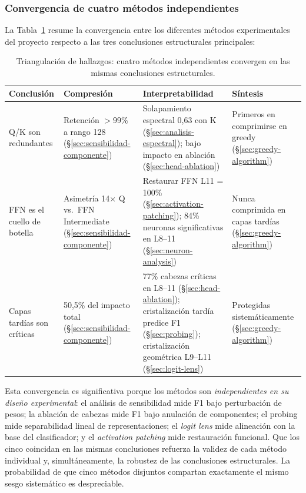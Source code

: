 \subsubsection{Convergencia de cuatro métodos independientes}

La Tabla~\ref{tab:triangulation} resume la convergencia entre los
diferentes métodos experimentales del proyecto respecto a las tres
conclusiones estructurales principales:

\begin{table}[ht]
\centering
\caption{Triangulación de hallazgos: cuatro métodos independientes
convergen en las mismas conclusiones estructurales.}
\label{tab:triangulation}
\small
\begin{tabular}{p{3.0cm}p{3.3cm}p{3.5cm}p{3.5cm}}
\toprule
\textbf{Conclusión} & \textbf{Compresión} & \textbf{Interpretabilidad} & \textbf{Síntesis} \\
\midrule
Q/K son redundantes &
  Retención $>$99\% a rango 128 (\S\ref{sec:sensibilidad-componente}) &
  Solapamiento espectral 0{,}63 con K (\S\ref{sec:analisis-espectral});
  bajo impacto en ablación (\S\ref{sec:head-ablation}) &
  Primeros en comprimirse en greedy (\S\ref{sec:greedy-algorithm}) \\
\addlinespace
FFN es el cuello de botella &
  Asimetría 14$\times$ Q vs.\ FFN Intermediate (\S\ref{sec:sensibilidad-componente}) &
  Restaurar FFN L11 = 100\% (\S\ref{sec:activation-patching});
  84\% neuronas significativas en L8--11 (\S\ref{sec:neuron-analysis}) &
  Nunca comprimida en capas tardías (\S\ref{sec:greedy-algorithm}) \\
\addlinespace
Capas tardías son críticas &
  50{,}5\% del impacto total (\S\ref{sec:sensibilidad-componente}) &
  77\% cabezas críticas en L8--11 (\S\ref{sec:head-ablation});
  cristalización tardía predice F1 (\S\ref{sec:probing});
  cristalización geométrica L9--L11 (\S\ref{sec:logit-lens}) &
  Protegidas sistemáticamente (\S\ref{sec:greedy-algorithm}) \\
\bottomrule
\end{tabular}
\end{table}

Esta convergencia es significativa porque los métodos son
\emph{independientes en su diseño experimental}: el análisis de
sensibilidad mide F1 bajo perturbación de pesos; la ablación de cabezas
mide F1 bajo anulación de componentes; el probing mide separabilidad
lineal de representaciones; el \emph{logit lens} mide alineación con la base del
clasificador; y el \emph{activation patching} mide restauración funcional. Que
los cinco coincidan en las mismas conclusiones refuerza la validez de cada
método individual y, simultáneamente, la robustez de las conclusiones
estructurales. La probabilidad de que cinco métodos disjuntos compartan
exactamente el mismo sesgo sistemático es despreciable.

